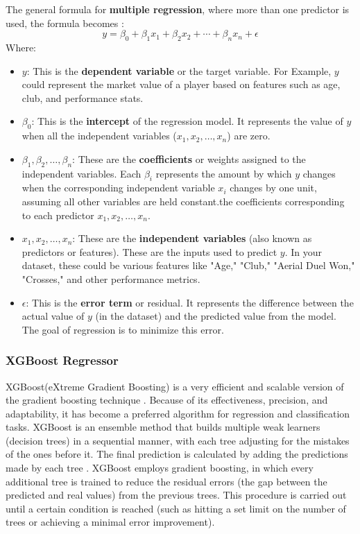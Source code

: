 \documentclass[12pt, a4paper,oneside]{book}
\numberwithin{equation}{section}
\begin{document}
The general formula for \textbf{multiple regression}, where more than one predictor is used, the formula becomes \cite{hayes2024}:
\[y = \beta_0 + \beta_1 x_1 + \beta_2 x_2 + \cdots + \beta_n x_n + \epsilon\]
Where:
\begin{itemize}
    \item \textbf{$y$}: This is the \textbf{dependent variable} or the target variable. For Example, $y$ could represent the market value of a player based on features such as age, club, and performance stats.
    \item \textbf{$\beta_0$}: This is the \textbf{intercept} of the regression model. It represents the value of $y$ when all the independent variables ($x_1, x_2, \dots, x_n$) are zero.
    \item \textbf{$\beta_1, \beta_2, \dots, \beta_n$}: These are the \textbf{coefficients} or weights assigned to the independent variables. Each $\beta_i$ represents the amount by which $y$ changes when the corresponding independent variable $x_i$ changes by one unit, assuming all other variables are held constant.the coefficients corresponding to each predictor \( x_1, x_2, \dots, x_n \).
    \item \textbf{$x_1, x_2, \dots, x_n$}: These are the \textbf{independent variables} (also known as predictors or features). These are the inputs used to predict $y$. In your dataset, these could be various features like "Age," "Club," "Aerial Duel Won," "Crosses," and other performance metrics.
    \item \textbf{$\epsilon$}: This is the \textbf{error term} or residual. It represents the difference between the actual value of $y$ (in the dataset) and the predicted value from the model. The goal of regression is to minimize this error.
\end{itemize}

\subsubsection{XGBoost Regressor}

XGBoost(eXtreme Gradient Boosting) is a very efficient and scalable version of the gradient boosting technique \cite{zhang2018}. Because of its effectiveness, precision, and adaptability, it has become a preferred algorithm for regression and classification tasks. XGBoost is an ensemble method that builds multiple weak learners (decision trees) in a sequential manner, with each tree adjusting for the mistakes of the ones before it. The final prediction is calculated by adding the predictions made by each tree \cite{li2019}. XGBoost employs gradient boosting, in which every additional tree is trained to reduce the residual errors (the gap between the predicted and real values) from the previous trees. This procedure is carried out until a certain condition is reached (such as hitting a set limit on the number of trees or achieving a minimal error improvement).
\end{document}
